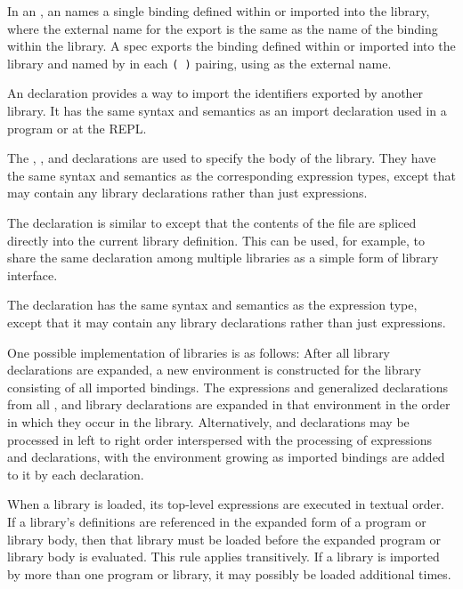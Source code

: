 In an , an  names a single
binding defined within or imported into the library, where the
external name for the export is the same as the name of the binding
within the library. A  spec exports the binding 
defined within or imported into the library and named by
 in each
{\tt( )} pairing,
using  as the external name.

An  declaration provides a way to import the identifiers
exported by another library.  It has the same syntax and semantics
as an import declaration used in a program or at the REPL.

The , , and  declarations are
used to specify the body of
the library.  They have the same syntax and semantics as the corresponding
expression types, except that
 may contain any library declarations rather than
just expressions.

The  declaration is similar to
 except that the contents of the file are spliced directly into the
current library definition.  This can be used, for example, to share the
same  declaration among multiple libraries as a simple
form of library interface.

The  declaration has the same syntax and semantics as
the  expression type, except that it may contain any
library declarations rather than just expressions.


One possible implementation of libraries is as follows:
After all  library declarations are expanded, a new
environment is constructed for the library consisting of all
imported bindings.  The expressions and
generalized declarations from all ,  and 
library declarations are expanded in that environment in the order in which
they occur in the library.
Alternatively,  and  declarations may be processed
in left to right order interspersed with the processing of expressions
and declarations, with the environment growing as imported bindings are
added to it by each  declaration.

When a library is loaded, its top-level expressions are executed
in textual order.
If a library's definitions are referenced in the expanded form of a
program or library body, then that library must be loaded before the
expanded program or library body is evaluated. This rule applies
transitively.  If a library is imported by more than one program or
library, it may possibly be loaded additional times.

